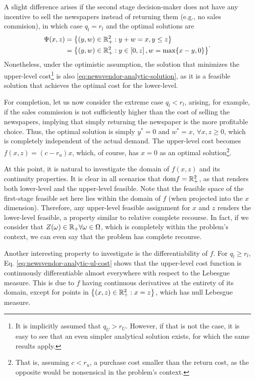 \documentclass[12pt]{article}
\begin{document}
A slight difference arises if the second stage decision-maker does not have any incentive to sell the newspapers instead of returning them (e.g., no sales commision), in which case $q_l = r_l$ and the optimal solutions are
\begin{equation*}
\begin{split}
    \Psi(x,z) &= \left\{ (y,w)\in \mathbb{R}^2_{+} : y+w = x, y\le z \right\} \\
	      &= \left\{ (y,w)\in \mathbb{R}^2_{+} : y \in \left[ 0,z \right] , w = \max\{x-y,0\} \right\} 
\end{split}
.\end{equation*}
Nonetheless, under the optimistic assumption, the solution that minimizes the upper-level cost\footnote{It is implicitly assumed that $q_U > r_U$. However, if that is not the case, it is easy to see that an even simpler analytical solution exists, for which the same results apply.} is also \eqref{eq:newsvendor-analytic-solution}, as it is a feasible solution that achieves the optimal cost for the lower-level.

For completion, let us now consider the extreme case $q_l < r_l$, arising, for example, if the sales commission is not sufficiently higher than the cost of selling the newspapers, implying that simply returning the newspaper is the more profitable choice.
Thus, the optimal solution is simply $y^{*}=0$ and $w^{*}=x$, $\forall x,z\ge 0$, which is completely independent of the actual demand.
The upper-level cost becomes $f(x,z) = (c - r_u) x$, which, of course, has $x=0$ as an optimal solution\footnote{That is, assuming $c< r_u$, a purchase cost smaller than the return cost, as the opposite would be nonsensical in the problem's context.}.

At this point, it is natural to investigate the domain of $f(x,z)$ and its continuity properties.
It is clear in all scenarios that $\text{dom} f = \mathbb{R}^{2}_{+}$, as that renders both lower-level and the upper-level feasible.
Note that the feasible space of the first-stage feasible set here lies within the domain of $f$ (when projected into the $x$ dimension).
Therefore, any upper-level feasible assignment for $x$ and $z$ renders the lower-level feasible, a property similar to relative complete recourse.
In fact, if we consider that $Z(\omega) \in \mathbb{R}_{+} \forall \omega \in \Omega$, which is completely within the problem's context, we can even say that the problem has complete recourse.

Another interesting property to investigate is the differentiability of $f$.
For $q_l \ge r_l$, Eq. \eqref{eq:newsvendor-analytic-ul-cost} shows that the upper-level cost function is continuously differentiable almost everywhere with respect to the Lebesgue measure.
This is due to $f$ having continuous derivatives at the entirety of its domain, except for points in $\left\{ (x,z) \in \mathbb{R}^2_{+} : x = z \right\}$, which has null Lebesgue measure.
\end{document}
